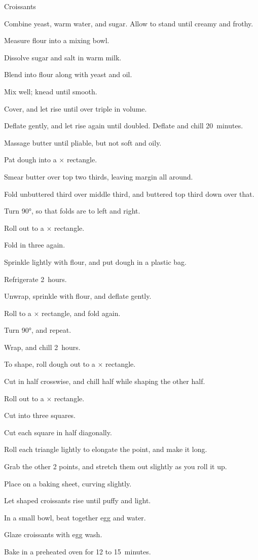 \begin{recipe}{Croissants \UNTESTED }{}{}
\begin{directions}
\item Combine yeast, warm water, and  sugar. Allow to stand until creamy and frothy.
\item Measure flour into a mixing bowl.
\item Dissolve  sugar and salt in warm milk.
\item Blend into flour along with yeast and oil.
\item Mix well; knead until smooth.
\item Cover, and let rise until over triple in volume.
\item Deflate gently, and let rise again until doubled. Deflate and chill 20~minutes.
\item Massage butter until pliable, but not soft and oily.
\item Pat dough into a $\times$ rectangle.
\item Smear butter over top two thirds, leaving \cm{\half} margin all around.
\item Fold unbuttered third over middle third, and buttered top third down over that.
\item Turn \ang{90}, so that folds are to left and right.
\item Roll out to a $\times$ rectangle.
\item Fold in three again.
\item Sprinkle lightly with flour, and put dough in a plastic bag.
\item Refrigerate 2~hours.
\item Unwrap, sprinkle with flour, and deflate gently.
\item Roll to a $\times$ rectangle, and fold again.
\item Turn \ang{90}, and repeat.
\item Wrap, and chill 2~hours.
\item To shape, roll dough out to a $\times$ rectangle.
\item Cut in half crosswise, and chill half while shaping the other half.
\item Roll out to a $\times$ rectangle.
\item Cut into three  squares.
\item Cut each square in half diagonally.
\item Roll each triangle lightly to elongate the point, and make it  long.
\item Grab the other 2 points, and stretch them out slightly as you roll it up.
\item Place on a baking sheet, curving slightly.
\item Let shaped croissants rise until puffy and light.
\item In a small bowl, beat together egg and  water.
\item Glaze croissants with egg wash.
\item Bake in a preheated  oven for 12 to 15~minutes.
\end{directions}
\end{recipe}
